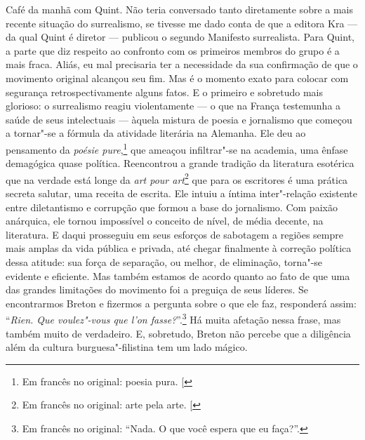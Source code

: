 Café da manhã com Quint. Não teria conversado
tanto diretamente sobre a mais recente situação do surrealismo, se
tivesse me dado conta de que a editora Kra --- da qual Quint é diretor ---
publicou o segundo Manifesto surrealista. Para Quint, a parte que diz
respeito ao confronto com os primeiros membros do grupo é a mais fraca.
Aliás, eu mal precisaria ter a necessidade da sua confirmação de que o
movimento original alcançou seu fim. Mas é o momento exato para colocar
com segurança retrospectivamente alguns fatos. E o primeiro e sobretudo
mais glorioso: o surrealismo reagiu violentamente --- o que na França
testemunha a saúde de seus intelectuais --- àquela mistura de poesia e
jornalismo que começou a tornar"-se a fórmula da atividade literária na
Alemanha. Ele deu ao pensamento da \emph{poésie pure},\footnote{Em francês no original: poesia pura. {[}\versal{N.~T.}{]}} que ameaçou
infiltrar"-se na academia, uma ênfase demagógica quase política.
Reencontrou a grande tradição da literatura esotérica que na verdade
está longe da \emph{art pour art}\footnote{Em francês no original: arte pela arte. {[}\versal{N.~T.}{]}} que para os escritores é uma prática
secreta salutar, uma receita de escrita. Ele intuiu a íntima
inter"-relação existente entre diletantismo e corrupção que formou a base
do jornalismo. Com paixão anárquica, ele tornou impossível o conceito de
nível, de média decente, na literatura. E daqui prosseguiu em seus
esforços de sabotagem a regiões sempre mais amplas da vida pública e
privada, até chegar finalmente à correção política dessa atitude: sua força de
separação, ou melhor, de eliminação, torna"-se evidente e eficiente. Mas
também estamos de acordo quanto ao fato de que uma das grandes
limitações do movimento foi a preguiça de seus líderes. Se encontrarmos
Breton e fizermos a pergunta sobre o que ele faz, responderá assim: ``\emph{Rien.
Que voulez"-vous que l'on fasse?}''.\footnote{Em francês no original: ``Nada. O que você espera que eu faça?''. \versal{[N.~T.]}} Há muita afetação nessa frase, mas
também muito de verdadeiro. E, sobretudo, Breton não percebe que a diligência além da cultura burguesa"-filistina tem um lado mágico. 

